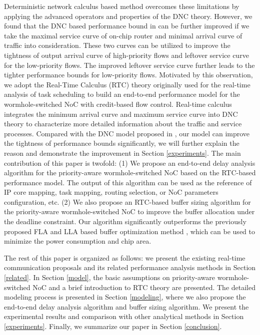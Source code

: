 \documentclass[10pt,journal]{IEEEtran}
\begin{document}
Deterministic network calculus based method \cite{Qian489900} overcomes these limitations by applying the advanced operators and properties of the DNC theory. However, we found that the DNC based performance bound in \cite{Qian489900} can be further improved if we take the maximal service curve of on-chip router and minimal arrival curve of traffic into consideration. These two curves can be utilized to improve the tightness of output arrival curve of high-priority flows and leftover service curve for the low-priority flows. The improved leftover service curve further leads to the tighter performance bounds for low-priority flows. Motivated by this observation, we adopt the Real-Time Calculus (RTC) theory \cite{1253607} originally used for the real-time analysis of task scheduling to build an end-to-end performance model for the wormhole-switched NoC with credit-based flow control. Real-time calculus integrates the minimum arrival curve and maximum service curve into DNC theory to characterize more detailed information about the traffic and service processes. Compared with the DNC model proposed in \cite{Qian489900}, our model can improve the tightness of performance bounds significantly, we will further explain the reason and demonstrate the improvement in Section \ref{experiments}. The main contribution of this paper is twofold: (1) We propose an end-to-end delay analysis algorithm for the priority-aware wormhole-switched NoC based on the RTC-based performance model. The output of this algorithm can be used as the reference of IP core mapping, task mapping, routing selection, or NoC parameters configuration, etc. (2) We also propose an RTC-based buffer sizing algorithm for the priority-aware wormhole-switched NoC to improve the buffer allocation under the deadline constraint. Our algorithm significantly outperforms the previously proposed FLA and LLA based buffer optimization method \cite{189}, which can be used to minimize the power consumption and chip area.

The rest of this paper is organized as follows: we present the existing real-time communication proposals and its related performance analysis methods in Section \ref{related}. In Section \ref{model}, the basic assumptions on priority-aware wormhole-switched NoC and a brief introduction to RTC theory are presented. The detailed modeling process is presented in Section \ref{modeling}, where we also propose the end-to-end delay analysis algorithm and buffer sizing algorithm. We present the experimental results and comparison with other analytical methods in Section \ref{experiments}. Finally, we summarize our paper in Section \ref{conclusion}.
\end{document}
